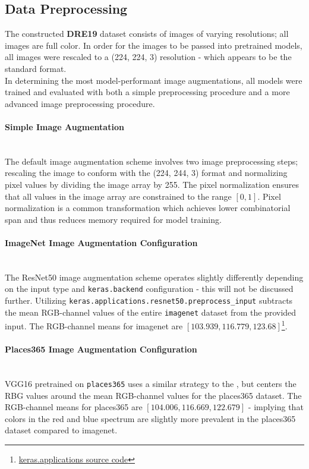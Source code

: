 \subsection{Data Preprocessing}
The constructed \textbf{DRE19} dataset consists of images of varying resolutions; all images are full color. 
In order for the images to be passed into pretrained models, all images were rescaled to a (224, 224, 3) resolution - which appears to be the standard format.
\\
In determining the most model-performant image augmentations, all models were trained and evaluated with both a simple preprocessing procedure and a more advanced image preprocessing procedure. 

\paragraph{Simple Image Augmentation} ~\\
The default image augmentation scheme involves two image preprocessing steps; rescaling the image to conform with the (224, 244, 3) format and normalizing pixel values by dividing the image array by 255. 
The pixel normalization ensures that all values in the image array are constrained to the range $[0,1]$. 
Pixel normalization is a common transformation which achieves lower combinatorial span and thus reduces memory required for model training.

\paragraph{ImageNet Image Augmentation Configuration}\label{par:resnet50} ~\\
The ResNet50 image augmentation scheme operates slightly differently depending on the input type and \texttt{keras.backend} configuration - this will not be discussed further. 
Utilizing \texttt{keras.applications.resnet50.preprocess\_input} subtracts the mean RGB-channel values of the entire \texttt{imagenet} dataset from the provided input. 
The RGB-channel means for imagenet are $[103.939, 116.779, 123.68]$\footnote{\href{https://github.com/keras-team/keras-applications/tree/8a1e4d427999c26d1a1988dda45454769c4372a5/keras_applications}{keras.applications source code}}.

\paragraph{Places365 Image Augmentation Configuration} ~\\
VGG16 pretrained on \texttt{places365}\autocite{gkallia2017keras_places365} uses a similar strategy to the , but centers the RBG values around the mean RGB-channel values for the places365 dataset. 
The RGB-channel means for places365 are $[104.006, 116.669, 122.679]$ - implying that colors in the red and blue spectrum are slightly more prevalent in the places365 dataset compared to imagenet.

